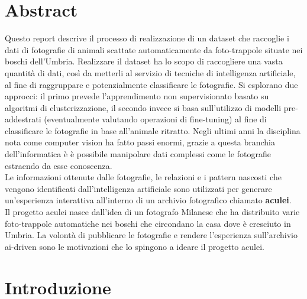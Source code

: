 \documentclass[12pt,a4paper,twoside]{article}
\begin{document}
\section*{Abstract}
Questo report descrive il processo di realizzazione di un dataset che raccoglie i dati di fotografie di animali scattate automaticamente da foto-trappole situate nei boschi dell'Umbria. Realizzare il dataset ha lo scopo di raccogliere una vasta quantità di dati, così da metterli al servizio di tecniche di intelligenza artificiale, al fine di raggruppare e potenzialmente classificare le fotografie. Si esplorano due approcci: il primo prevede l'apprendimento non supervisionato basato su algoritmi di clusterizzazione, il secondo invece si basa sull'utilizzo di modelli pre-addestrati (eventualmente valutando operazioni di fine-tuning) al fine di classificare le fotografie in base all'animale ritratto. Negli ultimi anni la disciplina nota come computer vision ha fatto passi enormi, grazie a questa branchia dell'informatica è  è possibile manipolare dati complessi come le fotografie estraendo da esse conoscenza. \\ Le informazioni ottenute dalle fotografie, le relazioni e i pattern nascosti che vengono identificati dall'intelligenza artificiale sono utilizzati per generare un'esperienza interattiva all'interno di un archivio fotografico chiamato \textbf{aculei}. \\ Il progetto aculei nasce dall'idea di un fotografo Milanese che ha distribuito varie foto-trappole automatiche nei boschi che circondano la casa dove è cresciuto in Umbria. La volontà di pubblicare le fotografie e rendere l'esperienza sull'archivio ai-driven sono le motivazioni che lo spingono a ideare il progetto aculei.

\section{Introduzione}
\end{document}
